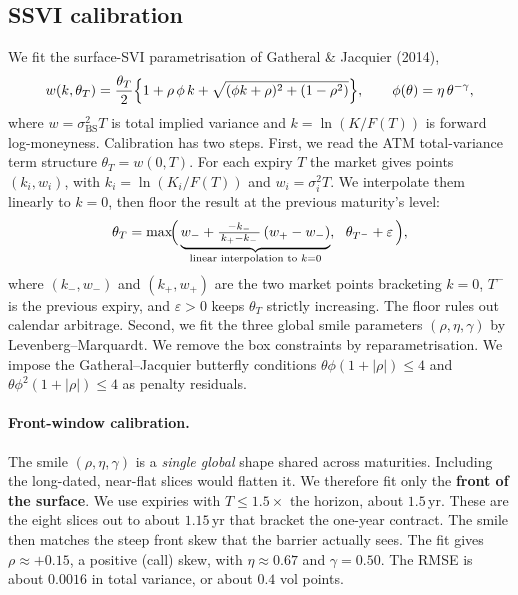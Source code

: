 \documentclass[11pt]{article}
\begin{document}
\subsection{SSVI calibration}
We fit the surface-SVI parametrisation of Gatheral \& Jacquier (2014),
\begin{equation}
  w(k,\theta_T)=\frac{\theta_T}{2}\Bigl\{1+\rho\,\phi\,k+\sqrt{(\phi k+\rho)^2+(1-\rho^2)}\Bigr\},
  \qquad \phi(\theta)=\eta\,\theta^{-\gamma},
\end{equation}
where $w=\sigma_{\mathrm{BS}}^2 T$ is total implied variance and $k=\ln(K/F(T))$ is forward
log-moneyness. Calibration has two steps. First, we read the ATM total-variance term structure
$\theta_T=w(0,T)$. For each expiry $T$ the market gives points $(k_i,w_i)$, with $k_i=\ln(K_i/F(T))$
and $w_i=\sigma_i^2 T$. We interpolate them linearly to $k=0$, then floor the result at the previous
maturity's level:
\begin{equation}
  \theta_T=\max\!\Bigl(\,\underbrace{w_-+\tfrac{-k_-}{\,k_+-k_-\,}\,(w_+-w_-)}_{\text{linear interpolation to }k=0},
  \ \ \theta_{T^-}+\varepsilon\,\Bigr),
  \label{eq:theta}
\end{equation}
where $(k_-,w_-)$ and $(k_+,w_+)$ are the two market points bracketing $k=0$, $T^-$ is the previous
expiry, and $\varepsilon>0$ keeps $\theta_T$ strictly increasing. The floor rules out calendar
arbitrage. Second, we fit the three global smile parameters $(\rho,\eta,\gamma)$ by
Levenberg--Marquardt. We remove the box constraints by reparametrisation. We impose the
Gatheral--Jacquier butterfly conditions $\theta\phi(1+|\rho|)\le4$ and $\theta\phi^2(1+|\rho|)\le4$
as penalty residuals.

\paragraph{Front-window calibration.} The smile $(\rho,\eta,\gamma)$ is a \emph{single global} shape
shared across maturities. Including the long-dated, near-flat slices would flatten it. We therefore
fit only the \textbf{front of the surface}. We use expiries with $T\le1.5\times$ the horizon, about
$1.5$\,yr. These are the eight slices out to about $1.15$\,yr that bracket the one-year contract.
The smile then matches the steep front skew that the barrier actually sees. The fit gives
$\rho\approx+0.15$, a positive (call) skew, with $\eta\approx0.67$ and $\gamma=0.50$. The RMSE is
about $0.0016$ in total variance, or about $0.4$ vol points.
\end{document}
